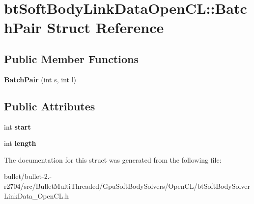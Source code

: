 \hypertarget{structbt_soft_body_link_data_open_c_l_1_1_batch_pair}{\section{bt\+Soft\+Body\+Link\+Data\+Open\+C\+L\+:\+:Batch\+Pair Struct Reference}
\label{structbt_soft_body_link_data_open_c_l_1_1_batch_pair}
}
\subsection*{Public Member Functions}
\begin{DoxyCompactItemize}
\item 
\hypertarget{structbt_soft_body_link_data_open_c_l_1_1_batch_pair_a927b04918a9de7b98885864618621103}{{\bfseries Batch\+Pair} (int s, int l)}\label{structbt_soft_body_link_data_open_c_l_1_1_batch_pair_a927b04918a9de7b98885864618621103}

\end{DoxyCompactItemize}
\subsection*{Public Attributes}
\begin{DoxyCompactItemize}
\item 
\hypertarget{structbt_soft_body_link_data_open_c_l_1_1_batch_pair_ab29a8cb7332edf3d46c6f07b7416489d}{int {\bfseries start}}\label{structbt_soft_body_link_data_open_c_l_1_1_batch_pair_ab29a8cb7332edf3d46c6f07b7416489d}

\item 
\hypertarget{structbt_soft_body_link_data_open_c_l_1_1_batch_pair_a81827dc414b02dba4c49022ed819070c}{int {\bfseries length}}\label{structbt_soft_body_link_data_open_c_l_1_1_batch_pair_a81827dc414b02dba4c49022ed819070c}

\end{DoxyCompactItemize}


The documentation for this struct was generated from the following file\+:\begin{DoxyCompactItemize}
\item 
bullet/bullet-\/2.-\/r2704/src/\+Bullet\+Multi\+Threaded/\+Gpu\+Soft\+Body\+Solvers/\+Open\+C\+L/bt\+Soft\+Body\+Solver\+Link\+Data\+\_\+\+Open\+C\+L.\+h\end{DoxyCompactItemize}
